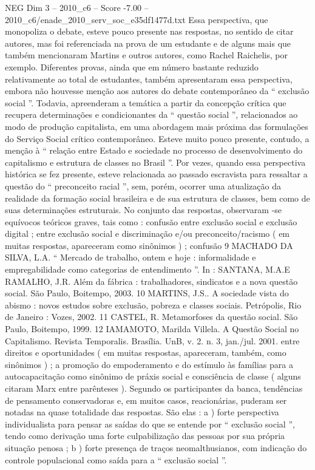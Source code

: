 \begin{textsample}{NEG Dim 3 – 2010\_c6 – Score -7.00 – 2010\_c6/enade\_2010\_serv\_soc\_e35df1477d.txt}
Essa perspectiva, que monopoliza o debate, esteve pouco presente nas respostas, no sentido de citar autores, mas foi referenciada na prova de um estudante e de alguns mais que também mencionaram Martins e outros autores, como Rachel Raichelis, por exemplo.
Diferentes provas, ainda que em número bastante reduzido relativamente ao total de estudantes, também apresentaram essa perspectiva, embora não houvesse menção aos autores do debate contemporâneo da “ exclusão social ”.
Todavia, apreenderam a temática a partir da concepção crítica que recupera determinações e condicionantes da “ questão social ”, relacionados ao modo de produção capitalista, em uma abordagem mais próxima das formulações do Serviço Social crítico contemporâneo.
Esteve muito pouco presente, contudo, a menção à “ relação entre Estado e sociedade no processo de desenvolvimento do capitalismo e estrutura de classes no Brasil ”.
Por vezes, quando essa perspectiva histórica se fez presente, esteve relacionada ao passado escravista para ressaltar a questão do “ preconceito racial ”, sem, porém, ocorrer uma atualização da realidade da formação social brasileira e de sua estrutura de classes, bem como de suas determinações estruturais.
No conjunto das respostas, observaram -se equívocos teóricos graves, tais como : confusão entre exclusão social e exclusão digital ; entre exclusão social e discriminação e/ou preconceito/racismo ( em muitas respostas, apareceram como sinônimos ) ; confusão 9 MACHADO DA SILVA, L.A. “ Mercado de trabalho, ontem e hoje : informalidade e empregabilidade como categorias de entendimento ”.
In : SANTANA, M.A.E RAMALHO, J.R.
Além da fábrica : trabalhadores, sindicatos e a nova questão social.
São Paulo, Boitempo, 2003. 10 MARTINS, J.S..
A sociedade vista do abismo : novos estudos sobre exclusão, pobreza e classes sociais.
Petrópolis, Rio de Janeiro : Vozes, 2002. 11 CASTEL, R.
Metamorfoses da questão social.
São Paulo, Boitempo, 1999. 12 IAMAMOTO, Marilda Villela.
A Questão Social no Capitalismo.
Revista Temporalis.
Brasília.
UnB, v. 2. n. 3, jan./jul. 2001. entre direitos e oportunidades ( em muitas respostas, apareceram, também, como sinônimos ) ; a promoção do empoderamento e do estímulo às famílias para a autocapacitação como sinônimo de práxis social e consciência de classe ( alguns citaram Marx entre parênteses ).
Segundo os participantes da banca, tendências de pensamento conservadoras e, em muitos casos, reacionárias, puderam ser notadas na quase totalidade das respostas.
São elas : a ) forte perspectiva individualista para pensar as saídas do que se entende por “ exclusão social ”, tendo como derivação uma forte culpabilização das pessoas por sua própria situação penosa ; b ) forte presença de traços neomalthusianos, com indicação do controle populacional como saída para a “ exclusão social ”.

\end{textsample}
